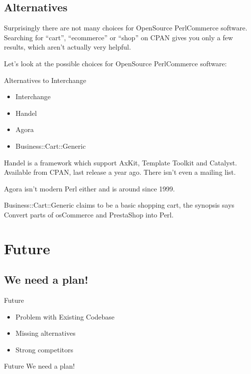 \subsection{Alternatives}
Surprisingly there are not many choices for OpenSource PerlCommerce
software. Searching for ``cart'', ``ecommerce'' or ``shop'' on CPAN
gives you only a few results, which aren't actually very helpful.

Let's look at the possible choices for OpenSource PerlCommerce software:

\begin{frame}{Alternatives to Interchange}
\begin{itemize}
\item Interchange
\item Handel
\item Agora
\item Business::Cart::Generic
\end{itemize}
\end{frame}

Handel is a framework which support AxKit, Template Toolkit 
and Catalyst.
Available from CPAN, last release a year ago.
There isn't even a mailing list.

Agora isn't modern Perl either and is around since 1999.

Business::Cart::Generic claims to be a basic shopping cart,
the synopsis says Convert parts of osCommerce and PrestaShop into
Perl.

\section{Future}
\subsection{We need a plan!}

\begin{frame}{Future}
\begin{itemize}
\item{Problem with Existing Codebase}
\item<2-3>{Missing alternatives}
\item<3>{Strong competitors}
\end{itemize}
\end{frame}

\begin{frame}{Future}
We need a plan!
\end{frame}

